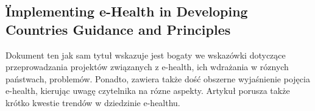 \documentclass[a4paper,10pt]{article}
\begin{document}
\subsection{\" Implementing e-Health in Developing Countries Guidance and Principles}
Dokument ten jak sam tytuł wskazuje jest bogaty we wskazówki dotyczące przeprowadzania projektów związanych z e-health, ich wdrażania w róznych państwach, problemów. Ponadto, zawiera także 
dość obszerne wyjaśnienie pojęcia e-health, kierując uwagę czytelnika na rózne aspekty. Artykuł porusza także krótko kwestie trendów w dziedzinie e-healthu.
\end{document}
